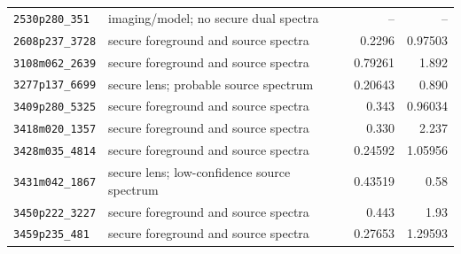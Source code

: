 \begin{table}
{\begin{tabular}{p{}p{}p{}rr}
\texttt{2530p280\_351} & imaging/model; no secure dual spectra & \citep{Huang2026} & -- & -- \\
\texttt{2608p237\_3728} & secure foreground and source spectra & \citep{Lin2026} & 0.2296 & 0.97503 \\
\texttt{3108m062\_2639} & secure foreground and source spectra & \citep{Huang2026,Tran2022,Barone2026} & 0.79261 & 1.892 \\
\texttt{3277p137\_6699} & secure lens; probable source spectrum & \citep{Huang2026,Tran2022,Barone2026} & 0.20643 & 0.890 \\
\texttt{3409p280\_5325} & secure foreground and source spectra & \citep{Lin2026,Tran2022} & 0.343 & 0.96034 \\
\texttt{3418m020\_1357} & secure foreground and source spectra & \citep{Lin2026,Sand2005} & 0.330 & 2.237 \\
\texttt{3428m035\_4814} & secure foreground and source spectra & \citep{Lin2026} & 0.24592 & 1.05956 \\
\texttt{3431m042\_1867} & secure lens; low-confidence source spectrum & \citep{Lin2026} & 0.43519 & 0.58 \\
\texttt{3450p222\_3227} & secure foreground and source spectra & \citep{Wen2011,Stark2013} & 0.443 & 1.93 \\
\texttt{3459p235\_481} & secure foreground and source spectra & \citep{Lin2026} & 0.27653 & 1.29593 \\
\bottomrule
\end{tabular}
}
\end{table}

